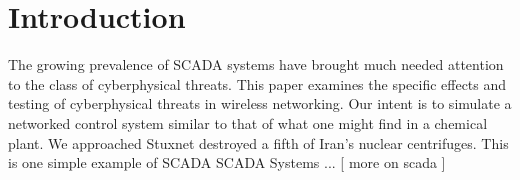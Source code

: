 \section{Introduction}
The growing prevalence of SCADA systems have brought much needed attention to the class of cyberphysical threats.  This paper examines the specific effects and testing of cyberphysical threats in wireless networking.  Our intent is to simulate a networked control system similar to that of what one might find in a chemical plant. We approached
Stuxnet destroyed a fifth of Iran's nuclear centrifuges.  This is one simple example of SCADA 
SCADA Systems ... [ more on scada ]

